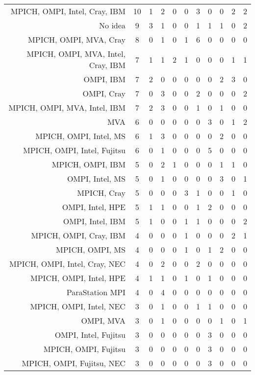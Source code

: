 {\begin{landscape}
\begin{longtable}[htb]{r|c|c|c|c|c|c|c|c|c|c}
{MPICH, OMPI, Intel, Cray, IBM} & 10 & 1 & 2 & 0 & 0 & 3 & 0 & 0 & 2 & 2 \\%
{No idea} & 9 & 3 & 1 & 0 & 0 & 1 & 1 & 1 & 0 & 2 \\%
{MPICH, OMPI, MVA, Cray} & 8 & 0 & 1 & 0 & 1 & 6 & 0 & 0 & 0 & 0 \\%
{MPICH, OMPI, MVA, Intel, Cray, IBM} & 7 & 1 & 1 & 2 & 1 & 0 & 0 & 0 & 1 & 1 \\%
{OMPI, IBM} & 7 & 2 & 0 & 0 & 0 & 0 & 0 & 2 & 3 & 0 \\%
{OMPI, Cray} & 7 & 0 & 3 & 0 & 0 & 2 & 0 & 0 & 0 & 2 \\%
{MPICH, OMPI, MVA, Intel, IBM} & 7 & 2 & 3 & 0 & 0 & 1 & 0 & 1 & 0 & 0 \\%
{MVA} & 6 & 0 & 0 & 0 & 0 & 0 & 3 & 0 & 1 & 2 \\%
{MPICH, OMPI, Intel, MS} & 6 & 1 & 3 & 0 & 0 & 0 & 0 & 2 & 0 & 0 \\%
{MPICH, OMPI, Intel, Fujitsu} & 6 & 0 & 1 & 0 & 0 & 0 & 5 & 0 & 0 & 0 \\%
{MPICH, OMPI, IBM} & 5 & 0 & 2 & 1 & 0 & 0 & 0 & 1 & 1 & 0 \\%
{OMPI, Intel, MS} & 5 & 0 & 1 & 0 & 0 & 0 & 0 & 3 & 0 & 1 \\%
{MPICH, Cray} & 5 & 0 & 0 & 0 & 3 & 1 & 0 & 0 & 1 & 0 \\%
{OMPI, Intel, HPE} & 5 & 1 & 1 & 0 & 0 & 1 & 2 & 0 & 0 & 0 \\%
{OMPI, Intel, IBM} & 5 & 1 & 0 & 0 & 1 & 1 & 0 & 0 & 0 & 2 \\%
{MPICH, OMPI, Cray, IBM} & 4 & 0 & 0 & 0 & 1 & 0 & 0 & 0 & 2 & 1 \\%
{MPICH, OMPI, MS} & 4 & 0 & 0 & 0 & 1 & 0 & 1 & 2 & 0 & 0 \\%
{MPICH, OMPI, Intel, Cray, NEC} & 4 & 0 & 2 & 0 & 0 & 2 & 0 & 0 & 0 & 0 \\%
{MPICH, OMPI, Intel, HPE} & 4 & 1 & 1 & 0 & 1 & 0 & 1 & 0 & 0 & 0 \\%
{ParaStation MPI} & 4 & 0 & 4 & 0 & 0 & 0 & 0 & 0 & 0 & 0 \\%
{MPICH, OMPI, Intel, NEC} & 3 & 0 & 1 & 0 & 0 & 1 & 1 & 0 & 0 & 0 \\%
{OMPI, MVA} & 3 & 0 & 1 & 0 & 0 & 0 & 0 & 1 & 0 & 1 \\%
{OMPI, Intel, Fujitsu} & 3 & 0 & 0 & 0 & 0 & 0 & 3 & 0 & 0 & 0 \\%
{MPICH, OMPI, Fujitsu} & 3 & 0 & 0 & 0 & 0 & 0 & 3 & 0 & 0 & 0 \\%
{MPICH, OMPI, Fujitsu, NEC} & 3 & 0 & 0 & 0 & 0 & 0 & 3 & 0 & 0 & 0 \\%

\end{longtable}
\end{landscape}}
